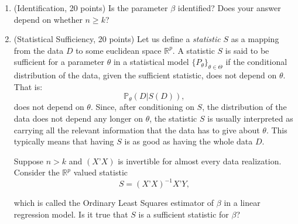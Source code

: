 \documentclass[11pt]{article} %
\begin{document}
\begin{enumerate}
\item (Identification, 20 points) Is the parameter $\beta$ identified? Does your answer depend on whether $n \geq k$?  

\item (Statistical Sufficiency, 20 points) Let us define a \emph{statistic} $S$ as a mapping from the data $D$ to some euclidean space $\mathbb{R}^{p}$. A statistic $S$ is said to be sufficient for a parameter $\theta$  in a statistical model $\{P_{\theta}\}_{\theta \in \Theta}$ if the conditional distribution of the data, given the sufficient statistic, does not depend on $\theta$. That is:
\[ \mathbb{P}_{\theta} (D | S(D)), \]
does not depend on $\theta$. Since, after conditioning on $S$, the distribution of the data does not depend any longer on $\theta$, the statistic $S$ is usually interpreted as carrying all the relevant information that the data has to give about $\theta$. This typically means that having $S$ is as good as having the whole data $D$. 

Suppose $n > k$ and $(X’X)$ is invertible for almost every data realization. Consider the $\mathbb{R}^{p}$ valued statistic 
\[ S = (X’X)^{-1} X’ Y, \]

which is called the Ordinary Least Squares estimator of $\beta$ in a linear regression model. Is it true that $S$ is a sufficient statistic for $\beta$?

\end{enumerate}
\end{document}
